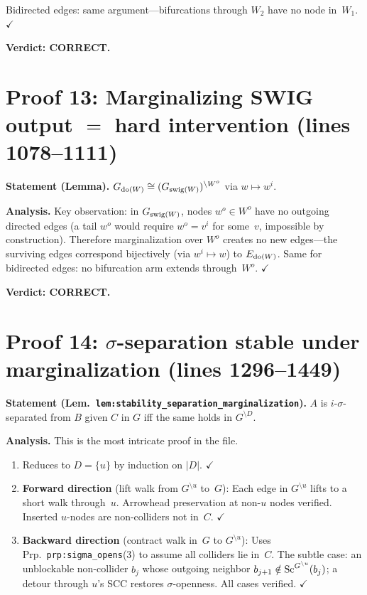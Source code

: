 \documentclass{article}
\begin{document}
Bidirected edges: same argument---bifurcations through $W_2$ have no node in~$W_1$.  $\checkmark$

\textbf{Verdict: CORRECT.}

\section{Proof 13: Marginalizing SWIG output $=$ hard intervention (lines 1078--1111)}

\textbf{Statement (Lemma).}
$G_{\operatorname{do}(W)} \cong (G_{\mathrm{swig}(W)})^{\setminus W^o}$ via $w\mapsto w^i$.

\textbf{Analysis.}
Key observation: in $G_{\mathrm{swig}(W)}$, nodes $w^o\in W^o$ have no outgoing directed edges
(a tail $w^o$ would require $w^o=v^i$ for some~$v$, impossible by construction).
Therefore marginalization over $W^o$ creates no new edges---the surviving
edges correspond bijectively (via $w^i\mapsto w$) to $E_{\operatorname{do}(W)}$.
Same for bidirected edges: no bifurcation arm extends through~$W^o$.  $\checkmark$

\textbf{Verdict: CORRECT.}

\section{Proof 14: $\sigma$-separation stable under marginalization (lines 1296--1449)}

\textbf{Statement (Lem.\ \texttt{lem:stability\_separation\_marginalization}).}
$A$ is $i$-$\sigma$-separated from $B$ given $C$ in $G$ iff the same holds in
$G^{\setminus D}$.

\textbf{Analysis.}
This is the most intricate proof in the file.
\begin{enumerate}[leftmargin=*]
  \item Reduces to $D=\{u\}$ by induction on $|D|$.  $\checkmark$
  \item \textbf{Forward direction} (lift walk from $G^{\setminus u}$ to~$G$):
    Each edge in $G^{\setminus u}$ lifts to a short walk through~$u$.
    Arrowhead preservation at non-$u$ nodes verified.
    Inserted $u$-nodes are non-colliders not in~$C$.  $\checkmark$
  \item \textbf{Backward direction} (contract walk in~$G$ to $G^{\setminus u}$):
    Uses Prp.~\texttt{prp:sigma\_opens}(3) to assume all colliders lie in~$C$.
    The subtle case: an unblockable non-collider $b_j$ whose outgoing neighbor
    $b_{j+1}\notin\mathrm{Sc}^{G^{\setminus u}}(b_j)$; a detour through $u$'s SCC restores
    $\sigma$-openness.  All cases verified.  $\checkmark$
\end{enumerate}
\end{document}
